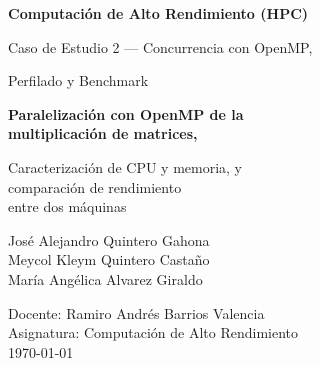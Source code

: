 \begin{titlepage}
    \centering
    \vspace*{2cm}

    {\Large\bfseries Computación de Alto Rendimiento (HPC)\par}
    \vspace{0.5cm}
    {\Large Caso de Estudio 2 --- Concurrencia con OpenMP,\par}
    \vspace{0.2cm}
    {\Large Perfilado y Benchmark\par}

    \vspace{2cm}

    {\Huge\bfseries Paralelización con OpenMP de la\\ multiplicación de matrices,\par}
    \vspace{0.3cm}
    {\Large Caracterización de CPU y memoria, y\\ comparación de rendimiento\\ entre dos máquinas\par}

    \vspace{2cm}

    {\Large
    José Alejandro Quintero Gahona\\[0.3cm]
    Meycol Kleym Quintero Castaño\\[0.3cm]
    María Angélica Alvarez Giraldo\\[0.3cm]
    }

    \vfill

    {\large
    Docente: Ramiro Andrés Barrios Valencia\\[0.3cm]
    Asignatura: Computación de Alto Rendimiento\\[0.3cm]
    \today
    \par}
\end{titlepage}
